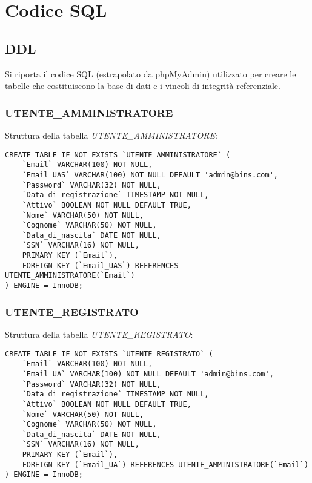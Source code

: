 
\chapter{Codice SQL}
\label{cap:codice-sql}

\section{DDL}
Si riporta il codice SQL (estrapolato da phpMyAdmin) utilizzato per creare le tabelle che costituiscono la base di dati e i vincoli di integrità referenziale.

\subsection{UTENTE\_AMMINISTRATORE}
Struttura della tabella \emph{UTENTE\_AMMINISTRATORE}:

\begin{lstlisting}
CREATE TABLE IF NOT EXISTS `UTENTE_AMMINISTRATORE` (
	`Email` VARCHAR(100) NOT NULL,
	`Email_UAS` VARCHAR(100) NOT NULL DEFAULT 'admin@bins.com',
	`Password` VARCHAR(32) NOT NULL,
	`Data_di_registrazione` TIMESTAMP NOT NULL,
	`Attivo` BOOLEAN NOT NULL DEFAULT TRUE,
	`Nome` VARCHAR(50) NOT NULL,
	`Cognome` VARCHAR(50) NOT NULL,
	`Data_di_nascita` DATE NOT NULL,
	`SSN` VARCHAR(16) NOT NULL,
	PRIMARY KEY (`Email`),
	FOREIGN KEY (`Email_UAS`) REFERENCES UTENTE_AMMINISTRATORE(`Email`)
) ENGINE = InnoDB;
\end{lstlisting}

\subsection{UTENTE\_REGISTRATO}
Struttura della tabella \emph{UTENTE\_REGISTRATO}:

\begin{lstlisting}
CREATE TABLE IF NOT EXISTS `UTENTE_REGISTRATO` (
	`Email` VARCHAR(100) NOT NULL,
	`Email_UA` VARCHAR(100) NOT NULL DEFAULT 'admin@bins.com',
	`Password` VARCHAR(32) NOT NULL,
	`Data_di_registrazione` TIMESTAMP NOT NULL,
	`Attivo` BOOLEAN NOT NULL DEFAULT TRUE,
	`Nome` VARCHAR(50) NOT NULL,
	`Cognome` VARCHAR(50) NOT NULL,
	`Data_di_nascita` DATE NOT NULL,
	`SSN` VARCHAR(16) NOT NULL,
	PRIMARY KEY (`Email`),
	FOREIGN KEY (`Email_UA`) REFERENCES UTENTE_AMMINISTRATORE(`Email`)
) ENGINE = InnoDB;
\end{lstlisting}


